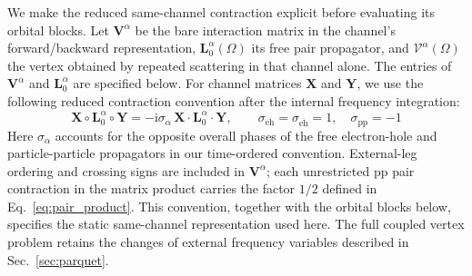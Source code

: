 \documentclass[aip,jcp,reprint,noshowkeys,superscriptaddress]{revtex4-1}
\newcommand{\eh}{\text{eh}}
\newcommand{\teh}{{\overline{\text{eh}}}}
\newcommand{\pp}{\text{pp}}
\newcommand{\ii}{\mathrm{i}}
\newcommand{\bL}{\boldsymbol{L}}
\newcommand{\bV}{\boldsymbol{V}}
\newcommand{\bcalV}{\boldsymbol{\mathcal V}}
\newcommand{\bX}{\boldsymbol{X}}
\newcommand{\bY}{\boldsymbol{Y}}
\begin{document}
We make the reduced same-channel contraction explicit before evaluating
its orbital blocks. Let $\bV^{\alpha}$ be the bare interaction matrix in the
channel's forward/backward representation, $\bL_0^{\alpha}(\Omega)$ its free
pair propagator, and $\bcalV^{\alpha}(\Omega)$ the vertex obtained by repeated
scattering in that channel alone. The entries of $\bV^{\alpha}$ and $\bL_0^{\alpha}$
are specified below. For channel matrices $\bX$ and $\bY$, we use the
following reduced contraction convention after the internal frequency
integration:
\begin{equation}
 \bX\circ\bL_0^{\alpha}\circ\bY
 =-\ii\sigma_{\alpha}\,\bX\cdot\bL_0^{\alpha}\cdot\bY,
 \qquad
 \sigma_{\eh}=\sigma_{\teh}=1,\quad \sigma_{\pp}=-1
 \label{eq:static_channel_contraction}
\end{equation}
Here $\sigma_{\alpha}$ accounts for the opposite overall phases of the free
electron-hole and particle-particle propagators in our time-ordered
convention. External-leg ordering and crossing signs are included in
$\bV^{\alpha}$; each unrestricted $\pp$ pair contraction in the matrix product
carries the factor $1/2$ defined in Eq.~\eqref{eq:pair_product}. This
convention, together with the orbital blocks below, specifies the static
same-channel representation used here. The full coupled vertex problem
retains the changes of external frequency variables described in
Sec.~\ref{sec:parquet}.
\end{document}
